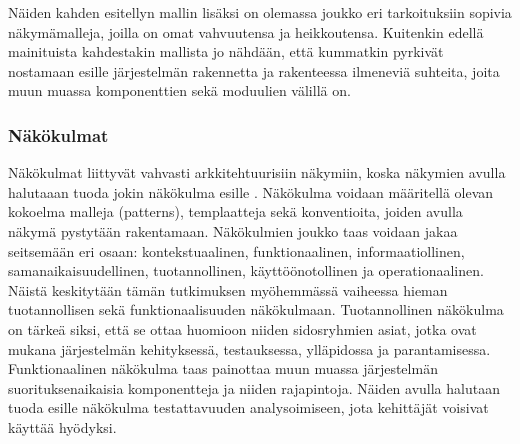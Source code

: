 \documentclass[finnish]{tktltiki2}
\numberwithin{table}{section}
\theoremstyle{definition}
\theoremstyle{remark}
\begin{document}
Näiden kahden esitellyn mallin lisäksi on olemassa joukko eri tarkoituksiin sopivia näkymämalleja, joilla on omat vahvuutensa ja heikkoutensa. Kuitenkin edellä mainituista kahdestakin mallista jo nähdään, että kummatkin pyrkivät nostamaan esille järjestelmän rakennetta ja rakenteessa ilmeneviä suhteita, joita muun muassa komponenttien sekä moduulien välillä on.




\subsubsection{Näkökulmat}
Näkökulmat liittyvät vahvasti arkkitehtuurisiin näkymiin, koska näkymien avulla halutaaan tuoda jokin näkökulma esille \citep[s. 36-42]{Rozanski:2011:SSA:2072649}. Näkökulma voidaan määritellä olevan kokoelma malleja (patterns), templaatteja sekä konventioita, joiden avulla näkymä pystytään rakentamaan.  Näkökulmien joukko taas voidaan jakaa seitsemään eri osaan: kontekstuaalinen, funktionaalinen, informaatiollinen, samanaikaisuudellinen, tuotannollinen, käyttöönotollinen ja operationaalinen. Näistä keskitytään tämän tutkimuksen myöhemmässä vaiheessa hieman tuotannollisen sekä funktionaalisuuden näkökulmaan. Tuotannollinen näkökulma on tärkeä siksi, että se ottaa huomioon niiden sidosryhmien asiat, jotka ovat mukana järjestelmän kehityksessä, testauksessa, ylläpidossa ja parantamisessa. Funktionaalinen näkökulma taas painottaa muun muassa järjestelmän suorituksenaikaisia komponentteja ja niiden rajapintoja. Näiden avulla halutaan tuoda esille näkökulma testattavuuden analysoimiseen, jota kehittäjät voisivat käyttää hyödyksi.
\end{document}
